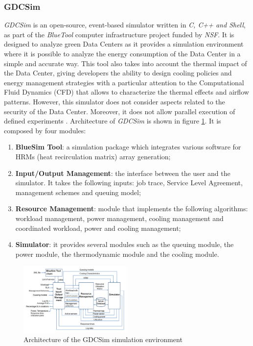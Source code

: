 {\subsubsection*{GDCSim}
\emph{GDCSim} \cite{gupta2011gdcsim} is an open-source, event-based simulator written in \emph{C, C++ and Shell}, as part of the \emph{BlueTool} computer infrastructure project funded by \emph{NSF}. It is designed to analyze green Data Centers as it provides a simulation environment where it is possible to analyze the energy consumption of the Data Center in a simple and accurate way. This tool also takes into account the thermal impact of the Data Center, giving developers the ability to design cooling policies and energy management strategies with a particular attention to the Computational Fluid Dynamics (CFD) that allows to characterize the thermal effects and airflow patterns. However, this simulator does not consider aspects related to the security of the Data Center. Moreover, it does not allow parallel execution of defined experiments \cite{mansouri2020cloud}.
Architecture of \emph{GDCSim} is shown in figure \ref{fig:gdcsim_arch}. It is composed by four modules:
\begin{enumerate}
    \item \textbf{BlueSim Tool}: a simulation package which integrates various software for HRMs (heat recirculation matrix) array generation;
    \item \textbf{Input/Output Management}: the interface between the user and the simulator. It takes the following inputs: job trace, Service Level Agreement, management schemes and queuing model;
    \item \textbf{Resource Management}: module that implements the following algorithms: workload management, power management, cooling management and coordinated workload, power and cooling management;
    \item \textbf{Simulator}: it provides several modules such as the queuing module, the power module, the thermodynamic module and the cooling module.
\end{enumerate}
\begin{figure}[h]
    \centering
    \includegraphics[width=0.5\textwidth]{chapters/images/gdcsim_arch.png}
    \caption{Architecture of the GDCSim simulation environment}
    \label{fig:gdcsim_arch}
\end{figure}

}
